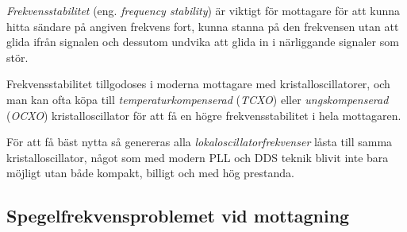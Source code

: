 \emph{Frekvensstabilitet} (eng. \emph{frequency stability}) är viktigt för
mottagare för att kunna hitta sändare på angiven frekvens fort, kunna stanna på
den frekvensen utan att glida ifrån signalen och dessutom undvika att glida in i
närliggande signaler som stör.

Frekvensstabilitet tillgodoses i moderna mottagare med kristalloscillatorer,
och man kan ofta köpa till \emph{temperaturkompenserad} (\emph{TCXO}) eller
\emph{ungskompenserad} (\emph{OCXO}) kristalloscillator för att få en högre
frekvensstabilitet i hela mottagaren.

För att få bäst nytta så genereras alla \emph{lokaloscillatorfrekvenser} låsta
till samma kristalloscillator, något som med modern PLL och DDS teknik blivit
inte bara möjligt utan både kompakt, billigt och med hög prestanda.


\subsection{Spegelfrekvensproblemet vid mottagning}
\label{spegelfrekvens_mottagare}


